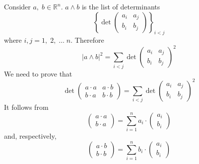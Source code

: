 \documentclass[color=black,11pt]{elegantpaper}
\begin{document}
   Consider $a,\; b\in \mathbb{R}^n.$ $a\wedge b$ is the list of determinants
$$
\left\{ \det\left( \begin{array}{cc}
                                       a_i & a_j \\
                                       b_i & b_j
                                   \end{array}\right)\right\}_{i<j}
$$
where $i,j=1,\;2,\;\dots \;n.$ Therefore
$$
|a\wedge b|^2 =  \sum_{i < j} \det\left( \begin{array}{cc}
                                       a_i & a_j \\
                                       b_i & b_j
                                   \end{array}\right)^2
$$
We need to prove that 
$$
 \det\left( \begin{array}{cc}
                                       a\cdot a & a\cdot b \\
                                       b\cdot a & b \cdot b
                                   \end{array}\right) =  \sum_{i < j} \det\left( \begin{array}{cc}
                                       a_i & a_j \\
                                       b_i & b_j
                                   \end{array}\right)^2
$$
It follows from
$$
\left( \begin{array}{c}
          a\cdot a\\
          b\cdot a
       \end{array} \right) =\sum_{i=1}^n a_i \cdot \left( \begin{array}{c}
                                                                a_i\\
                                                                b_i
                                                           \end{array} \right)
$$
and, respectively,
$$
\left( \begin{array}{c}
          a\cdot b\\
          b\cdot b
       \end{array} \right) =\sum_{i=1}^n b_i \cdot \left( \begin{array}{c}
                                                                a_i\\
                                                                b_i
                                                           \end{array} \right)
$$
\end{document}
